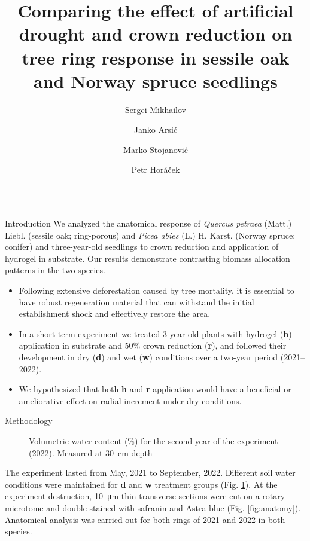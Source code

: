 \documentclass[final]{beamer}
\title{Comparing the effect of artificial drought and crown reduction on tree ring response in sessile oak and Norway spruce seedlings}
\author{Sergei Mikhailov \inst{1-3} \and Janko Arsić \inst{1-2} \and Marko Stojanović \inst{2} \and Petr Horáček \inst{1-2}}
\institute[MendelU]{\inst{1} Mendel University in Brno, CZ \samelineand \inst{2} Global Change Research Institute CAS, CZ \\ \inst{3} Komarov Botanical Institute RAS, RU}
\newlength{\sepwidth}
\newlength{\colwidth}
\newcommand{\separatorcolumn}{\begin{column}{\sepwidth}\end{column}}
\begin{document}
\begin{frame}[t]
\begin{columns}[t]


\begin{column}{\colwidth}

\begin{alertblock}{Introduction}
    We analyzed the anatomical response of \textit{Quercus petraea} (Matt.) Liebl. (sessile oak; ring-porous) and \textit{Picea abies} (L.) H. Karst. (Norway spruce; conifer) and three-year-old seedlings to crown reduction and application of hydrogel in substrate. Our results demonstrate contrasting biomass allocation patterns in the two species.
    \begin{itemize}
        \item Following extensive deforestation caused by tree mortality, it is essential to have robust regeneration material that can withstand the initial establishment shock and effectively restore the area.
        \item In a short-term experiment we treated 3-year-old plants with hydrogel (\textbf{h}) application in substrate and 50\% crown reduction (\textbf{r}), and followed their development in dry (\textbf{d}) and wet (\textbf{w}) conditions over a two-year period (2021--2022).
        \item We hypothesized that both \textbf{h} and \textbf{r} application would have a beneficial or ameliorative effect on radial increment under dry conditions.
    \end{itemize}
\end{alertblock}

\begin{block}{Methodology}
\begin{minipage}[t]{0.45\textwidth}
    \begin{figure}
        
        \caption{Volumetric water content (\%) for the second year of the experiment (2022). Measured at \SI{30}{\centi\meter} depth}
        \label{fig:vwc}
    \end{figure}
\end{minipage}\hfill
\normalsize
\begin{minipage}[t]{0.45\textwidth}
    The experiment lasted from May, 2021 to September, 2022.
    Different soil water conditions were maintained for \textbf{d} and \textbf{w} treatment groups (Fig. \ref{fig:vwc}).
    At the experiment destruction, \SI{10}{\micro\meter}-thin transverse sections were cut on a rotary microtome and double-stained with safranin and Astra blue (Fig. \ref{fig:anatomy}).
    Anatomical analysis was carried out for both rings of 2021 and 2022 in both species.


\end{minipage}
\end{block}
\end{column}
\end{columns}
\end{frame}
\end{document}

